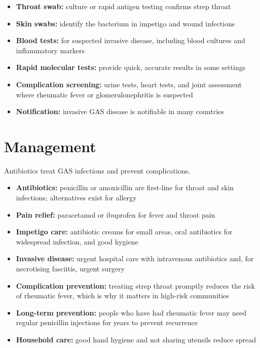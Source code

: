 \begin{itemize}
    \item \textbf{Throat swab:} culture or rapid antigen testing confirms strep throat
    \item \textbf{Skin swabs:} identify the bacterium in impetigo and wound infections
    \item \textbf{Blood tests:} for suspected invasive disease, including blood cultures and inflammatory markers
    \item \textbf{Rapid molecular tests:} provide quick, accurate results in some settings
    \item \textbf{Complication screening:} urine tests, heart tests, and joint assessment where rheumatic fever or glomerulonephritis is suspected
    \item \textbf{Notification:} invasive GAS disease is notifiable in many countries
\end{itemize}

\section*{Management}
Antibiotics treat GAS infections and prevent complications.

\begin{itemize}
    \item \textbf{Antibiotics:} penicillin or amoxicillin are first-line for throat and skin infections; alternatives exist for allergy
    \item \textbf{Pain relief:} paracetamol or ibuprofen for fever and throat pain
    \item \textbf{Impetigo care:} antibiotic creams for small areas, oral antibiotics for widespread infection, and good hygiene
    \item \textbf{Invasive disease:} urgent hospital care with intravenous antibiotics and, for necrotising fasciitis, urgent surgery
    \item \textbf{Complication prevention:} treating strep throat promptly reduces the risk of rheumatic fever, which is why it matters in high-risk communities
    \item \textbf{Long-term prevention:} people who have had rheumatic fever may need regular penicillin injections for years to prevent recurrence
    \item \textbf{Household care:} good hand hygiene and not sharing utensils reduce spread
\end{itemize}

